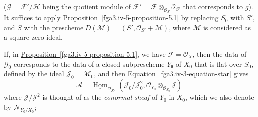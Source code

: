   (\(\mathscr {G}=\mathscr {F}'/\mathscr {H}\) being the quotient module of \(\mathscr {F}'=\mathscr {F}\otimes _{\mathcal {O}_S}\mathcal {O}_{S'}\) that corresponds to \(g\)).
  It suffices to apply \hyperref[fga3.iv-5-proposition-5.1]{Proposition~\ref*{fga3.iv-5-proposition-5.1}} by replacing \(S_0\) with \(S'\), and \(S\) with the prescheme \(D(\mathscr {M})=(S',\mathcal {O}_{S'}+\mathscr {M})\), where \(\mathscr {M}\) is considered as a square-zero ideal.\par{}If, in \hyperref[fga3.iv-5-proposition-5.1]{Proposition~\ref*{fga3.iv-5-proposition-5.1}}, we have \(\mathscr {F}=\mathcal {O}_X\), then the data of \(\mathscr {G}_0\) corresponds to the data of a closed subprescheme \(Y_0\) of \(X_0\) that is flat over \(S_0\), defined by the ideal \(\mathscr {J}_0=\mathscr {M}_0\), and then \hyperref[fga3.iv-3-equation-star]{Equation~\ref*{fga3.iv-3-equation-star}} gives
  \[     \mathscr {A}     = \underline {\operatorname {Hom}}_{\mathcal {O}_{X_0}}(\mathscr {J}_0/\mathscr {J}_0^2,\mathcal {O}_{Y_0}\otimes _{\mathcal {O}_{S_0}}\mathscr {J})   \]
  where \(\mathscr {J}/\mathscr {J}^2\) is thought of as the \emph{conormal sheaf} of \(Y_0\) in \(X_0\), which we also denote by \(\mathscr {N}_{Y_0/X_0}\);
  
